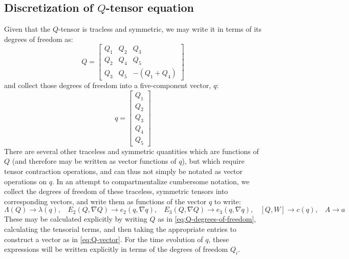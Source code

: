 \documentclass[reqno]{article}
\begin{document}
  \subsection{Discretization of $Q$-tensor equation}
  Given that the $Q$-tensor is tracless and symmetric, we may write it in terms
  of its degrees of freedom as:
  \begin{equation} \label{eq:Q-degrees-of-freedom}
    Q
    =
    \begin{bmatrix}
      Q_1 & Q_2 & Q_3 \\
      Q_2 & Q_4 & Q_5 \\
      Q_3 & Q_5 & -(Q_1 + Q_4)
    \end{bmatrix}
  \end{equation}
  and collect those degrees of freedom into a five-component vector, $q$:
  \begin{equation} \label{eq:Q-vector}
    q
    =
    \begin{bmatrix}
      Q_1 \\
      Q_2 \\
      Q_3 \\
      Q_4 \\
      Q_5
    \end{bmatrix}
  \end{equation}
  There are several other traceless and symmetric quantities which are functions
  of $Q$ (and therefore may be written as vector functions of $q$), but which
  require tensor contraction operations, and can thus not simply be notated as
  vector operations on $q$.
  In an attempt to compartmentalize cumbersome notation, we collect the degrees
  of freedom of these traceless, symmetric tensors into corresponding vectors,
  and write them as functions of the vector $q$ to write:
  \begin{equation}
    \Lambda (Q) \to \lambda(q), \:\:\:\:
    E_2(Q, \nabla Q) \to e_2(q, \nabla q), \:\:\:\:
    E_3(Q, \nabla Q) \to e_3(q, \nabla q), \:\:\:\: 
    [Q, W] \to c(q), \:\:\:\:
    A \to a
  \end{equation}
  These may be calculated explicitly by writing $Q$ as in
  \eqref{eq:Q-degrees-of-freedom}, calculating the tensorial terms, and then
  taking the appropriate entries to construct a vector as in
  \eqref{eq:Q-vector}.
  For the time evolution of $q$, these expressions will be written explicitly in terms of the
  degrees of freedom $Q_i$.
\end{document}
